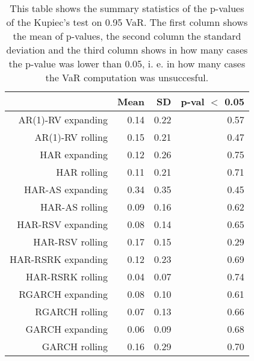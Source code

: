\begin{table}[ht]
\centering
\begin{tabular}{rrrr}
  \hline
 & Mean & SD & p-val $<$ 0.05 \\ 
  \hline
AR(1)-RV expanding & 0.14 & 0.22 & 0.57 \\ 
  AR(1)-RV rolling & 0.15 & 0.21 & 0.47 \\ 
  HAR expanding & 0.12 & 0.26 & 0.75 \\ 
  HAR rolling & 0.11 & 0.21 & 0.71 \\ 
  HAR-AS expanding & 0.34 & 0.35 & 0.45 \\ 
  HAR-AS rolling & 0.09 & 0.16 & 0.62 \\ 
  HAR-RSV expanding & 0.08 & 0.14 & 0.65 \\ 
  HAR-RSV rolling & 0.17 & 0.15 & 0.29 \\ 
  HAR-RSRK expanding & 0.12 & 0.23 & 0.69 \\ 
  HAR-RSRK rolling & 0.04 & 0.07 & 0.74 \\ 
  RGARCH expanding & 0.08 & 0.10 & 0.61 \\ 
  RGARCH rolling & 0.07 & 0.13 & 0.66 \\ 
  GARCH expanding & 0.06 & 0.09 & 0.68 \\ 
  GARCH rolling & 0.16 & 0.29 & 0.70 \\ 
   \hline
\end{tabular}
\caption[Kupiec's test p-values summary, alpha =0.95]{This table shows the summary statistics of the p-values of the Kupiec's test on 0.95 VaR. 
            The first column shows the mean of p-values, the second column the standard deviation 
            and the third column shows in how many cases the p-value was lower than 0.05, i. e. in how many cases the VaR computation was unsuccesful.} 
\label{Table:Kupiec_test_summary_0.95}
\end{table}

